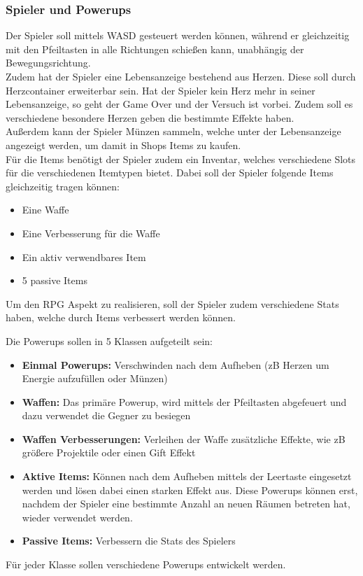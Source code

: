 \subsubsection{Spieler und Powerups}
Der Spieler soll mittels WASD gesteuert werden können, während er gleichzeitig mit den Pfeiltasten in alle Richtungen schießen kann, unabhängig der Bewegungsrichtung. \\
Zudem hat der Spieler eine Lebensanzeige bestehend aus Herzen. Diese soll durch Herzcontainer erweiterbar sein. Hat der Spieler kein Herz mehr in seiner Lebensanzeige, so geht der Game Over und der Versuch ist vorbei.
Zudem soll es verschiedene besondere Herzen geben die bestimmte Effekte haben.\\
Außerdem kann der Spieler Münzen sammeln, welche unter der Lebensanzeige angezeigt werden, um damit in Shops Items zu kaufen.\\
Für die Items benötigt der Spieler zudem ein Inventar, welches verschiedene Slots für die verschiedenen Itemtypen bietet. Dabei soll der Spieler folgende Items gleichzeitig tragen können:
\begin{itemize}
\item Eine Waffe
\item Eine Verbesserung für die Waffe
\item Ein aktiv verwendbares Item
\item 5 passive Items
\end{itemize}
Um den RPG Aspekt zu realisieren, soll der Spieler zudem verschiedene Stats haben, welche durch Items verbessert werden können.
\bigskip

Die Powerups sollen in 5 Klassen aufgeteilt sein:
\begin{itemize}
\item \textbf{Einmal Powerups:} Verschwinden nach dem Aufheben (zB Herzen um Energie aufzufüllen oder Münzen)
\item \textbf{Waffen:} Das primäre Powerup, wird mittels der Pfeiltasten abgefeuert und dazu verwendet die Gegner zu besiegen
\item \textbf{Waffen Verbesserungen:} Verleihen der Waffe zusätzliche Effekte, wie zB größere Projektile oder einen Gift Effekt
\item \textbf{Aktive Items:} Können nach dem Aufheben mittels der Leertaste eingesetzt werden und lösen dabei einen starken Effekt aus. Diese Powerups können erst, nachdem der Spieler eine bestimmte Anzahl an neuen Räumen betreten hat, wieder verwendet werden.
\item \textbf{Passive Items:} Verbessern die Stats des Spielers
\end{itemize}
Für jeder Klasse sollen verschiedene Powerups entwickelt werden.

